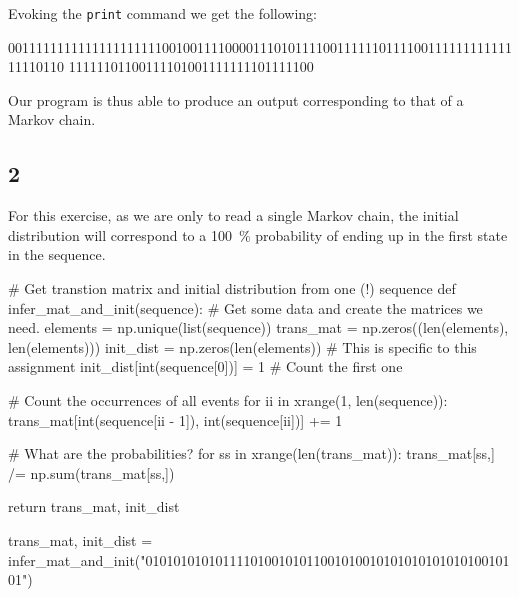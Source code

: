 \documentclass[10pt]{article}\usepackage[]{graphicx}\usepackage[]{color}
\theoremstyle{plain}
\begin{document}
Evoking the \texttt{print} command we get the following:
\begin{Schunk}
\begin{Soutput}
00111111111111111111110010011110000111010111100111111011110011111111111111110110
11111101100111101001111111101111100
\end{Soutput}
\end{Schunk}

Our program is thus able to produce an output corresponding to that of a Markov chain.

\subsection*{2}
For this exercise, as we are only to read a single Markov chain, the initial distribution will correspond to a 100~\% probability of ending up in the first state in the sequence. 
\begin{Schunk}
\begin{Sinput}
# Get transtion matrix and initial distribution from one (!) sequence
def infer_mat_and_init(sequence):
    # Get some data and create the matrices we need.
    elements = np.unique(list(sequence))
    trans_mat = np.zeros((len(elements), len(elements)))
    init_dist = np.zeros(len(elements)) # This is specific to this assignment
    init_dist[int(sequence[0])] = 1  # Count the first one

    # Count the occurrences of all events
    for ii in xrange(1, len(sequence)):
        trans_mat[int(sequence[ii - 1]), int(sequence[ii])] += 1

    # What are the probabilities?
    for ss in xrange(len(trans_mat)):
       trans_mat[ss,] /= np.sum(trans_mat[ss,])

    return trans_mat, init_dist


trans_mat, init_dist = infer_mat_and_init("010101010101111010010101100101001010101010101010010101")
\end{Sinput}
\end{Schunk}
\end{document}
